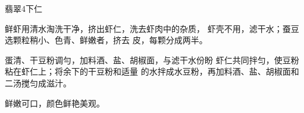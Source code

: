 \begin{recipe}{翡翠4下仁}

\ingredients


\cooking

\step 鲜虾用清水淘洗干净，挤出虾仁，洗去虾肉中的杂质， 虾壳不用，滤干水；蚕豆选颗粒稍小、色青、鲜嫩者，挤去 皮，每颗分成两半。

\step 蛋清、干豆粉调勻，加料酒、盐、胡椒面，与滤干水份盼 虾仁共同拌匀，使豆粉粘在虾仁上；将余下的干豆粉和适量 的水拌成水豆粉，再加料酒、盐、胡椒面和二汤搅匀成滋汁。

\notes

鲜嫩可口，颜色鲜艳美观。

\end{recipe}

